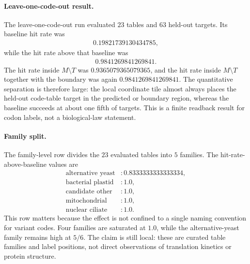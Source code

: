 \paragraph{Leave-one-code-out result.} The leave-one-code-out run evaluated $23$ tables and $63$ held-out targets. Its baseline hit rate was
$$
\begin{aligned}
0.19821739130434785,
\end{aligned}
$$
while the hit rate above that baseline was
$$
\begin{aligned}
0.9841269841269841.
\end{aligned}
$$
The hit rate inside $M\setminus T$ was $0.9365079365079365$, and the hit rate inside $M\setminus T$ together with the boundary was again $0.9841269841269841$. The quantitative separation is therefore large: the local coordinate tile almost always places the held-out code-table target in the predicted or boundary region, whereas the baseline succeeds at about one fifth of targets. This is a finite readback result for codon labels, not a biological-law statement.

\paragraph{Family split.} The family-level row divides the $23$ evaluated tables into $5$ families. The hit-rate-above-baseline values are
$$
\begin{aligned}
\text{alternative yeast}&:0.8333333333333334,\\
\text{bacterial plastid}&:1.0,\\
\text{candidate other}&:1.0,\\
\text{mitochondrial}&:1.0,\\
\text{nuclear ciliate}&:1.0.
\end{aligned}
$$
This row matters because the effect is not confined to a single naming convention for variant codes. Four families are saturated at $1.0$, while the alternative-yeast family remains high at $5/6$. The claim is still local: these are curated table families and label positions, not direct observations of translation kinetics or protein structure.


